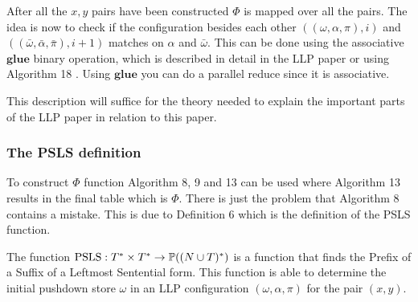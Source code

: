 After all the $x, y$ pairs have been constructed $\Phi$ is mapped over all the pairs. The idea is now to check if the configuration besides each other $((\omega, \alpha, \pi), i)$ and $((\bar{\omega}, \bar{\alpha}, \bar{\pi}), i + 1)$ matches on $\alpha$ and $\bar{\omega}$. This can be done using the associative $\mathbf{glue}$ binary operation, which is described in detail in the LLP paper \cite[7]{Vagner2007} or using Algorithm 18 \cite[18]{Vagner2007}. Using $\mathbf{glue}$ you can do a parallel reduce since it is associative.

This description will suffice for the theory needed to explain the important parts of the LLP paper \cite{Vagner2007} in relation to this paper.

\subsubsection{The PSLS definition}
To construct $\Phi$ function Algorithm 8, 9 and 13 \cite[13, 15]{Vagner2007} can be used where Algorithm 13 results in the final table which is $\Phi$. There is just the problem that Algorithm 8 contains a mistake. This is due to Definition 6 \cite[12]{Vagner2007} which is the definition of the PSLS function.

The function $\text{PSLS}: T^* \times T^* \to \mathbb{P}((N \cup T)^*)$ is a function that finds the Prefix of a Suffix of a Leftmost Sentential form. This function is able to determine the initial pushdown store $\omega$ in an LLP configuration $(\omega, \alpha, \pi)$ for the pair $(x, y)$.

